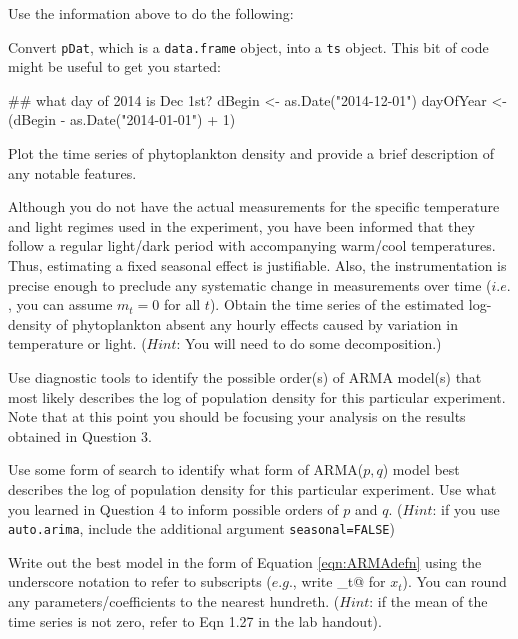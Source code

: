 \noindent Use the information above to do the following:

\begin{hwenumerate} 

\item Convert \texttt{pDat}, which is a \texttt{data.frame} object, into a \texttt{ts} object.  This bit of code might be useful to get you started:

\begin{Schunk}
\begin{Sinput}
 ## what day of 2014 is Dec 1st?
 dBegin <- as.Date("2014-12-01")
 dayOfYear <- (dBegin - as.Date("2014-01-01") + 1)
\end{Sinput}
\end{Schunk}

\item Plot the time series of phytoplankton density and provide a brief description of any notable features.

\item Although you do not have the actual measurements for the specific temperature and light regimes used in the experiment, you have been informed that they follow a regular light/dark period with accompanying warm/cool temperatures.  Thus, estimating a fixed seasonal effect is justifiable.  Also, the instrumentation is precise enough to preclude any systematic change in measurements over time ($i.e.$, you can assume $m_t = 0$ for all $t$).  Obtain the time series of the estimated log-density of phytoplankton absent any hourly effects caused by variation in temperature or light. ($Hint$: You will need to do some decomposition.)

\item Use diagnostic tools to identify the possible order(s) of ARMA model(s) that most likely describes the log of population density for this particular experiment.  Note that at this point you should be focusing your analysis on the results obtained in Question 3.

\item Use some form of search to identify what form of ARMA($p,q$) model best describes the log of population density for this particular experiment. Use what you learned in Question 4 to inform possible orders of $p$ and $q$. ($Hint$: if you use \texttt{auto.arima}, include the additional argument \texttt{seasonal=FALSE})

\item Write out the best model in the form of Equation \eqref{eqn:ARMAdefn} using the underscore notation to refer to subscripts ($e.g.$, write \verb@x_t@ for $x_t$). You can round any parameters/coefficients to the nearest hundreth. ($Hint$: if the mean of the time series is not zero, refer to Eqn 1.27 in the lab handout).

\end{hwenumerate}







